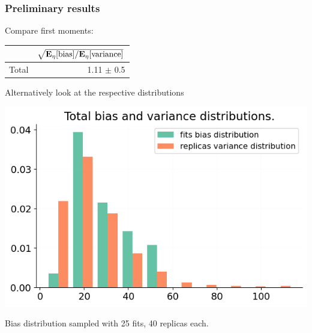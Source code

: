 \begin{frame}\frametitle{Preliminary results}
    \Fontvi
    Compare first moments:

    \begin{center}
    \begin{tabular}{lr}
        \toprule
        {} &  $\sqrt{\mathbf{E}_{\eta}[{\rm bias}] / \mathbf{E}_{\eta}[{\rm variance}]}$\\
        \midrule
        Total      & 1.11 $\pm$ 0.5 \\
        \bottomrule
        \end{tabular}
    \end{center}

    \vspace{8pt}
    Alternatively look at the respective distributions

    \vspace{8pt}
    \begin{center}
        \includegraphics[scale=0.3]{closure_test/plot_bias_variance_distributions_3.png}
    \end{center}

    \vspace{8pt}
    Bias distribution sampled with 25 fits, 40 replicas each.

\end{frame}
